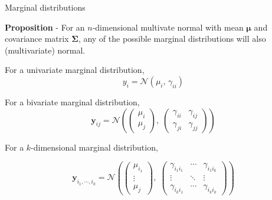 \documentclass[11pt,ignorenonframetext,]{beamer}
\begin{document}
\begin{frame}{Marginal distributions}

\small

\textbf{Proposition} - For an \(n\)-dimensional multivate normal with
mean \(\bm\mu\) and covariance matrix \(\bm\Sigma\), any of the possible
marginal distributions will also (multivariate) normal.

\pause

\vspace{2mm}

For a univariate marginal distribution,
\[ y_i = \mathcal{N}(\mu_i,\,\gamma_{ii}) \]

\pause

For a bivariate marginal distribution,
\[ \bm{y}_{ij} = \mathcal{N}\left( \begin{pmatrix}\mu_i \\ \mu_j \end{pmatrix},\; \begin{pmatrix} \gamma_{ii} & \gamma_{ij} \\ \gamma_{ji} & \gamma_{jj} \end{pmatrix} \right) \]

\pause

For a \(k\)-dimensional marginal distribution,

\[ 
\bm{y}_{i_1,\cdots,i_k} = 
  \mathcal{N}\left( 
    \begin{pmatrix}\mu_{i_1} \\ \vdots \\ \mu_j \end{pmatrix},\; 
    \begin{pmatrix} 
      \gamma_{i_1i_1}  & \cdots & \gamma_{i_1 i_k} \\ 
      \vdots           & \ddots & \vdots \\
      \gamma_{i_k i_1} & \cdots & \gamma_{i_k i_k} \end{pmatrix} 
  \right) 
\]

\end{frame}
\end{document}
